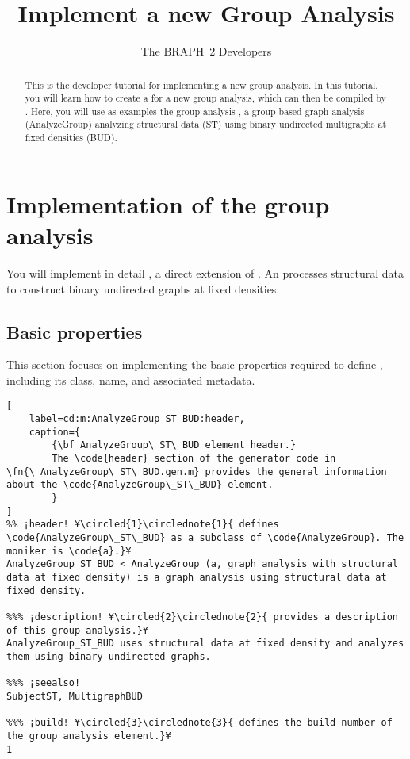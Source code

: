 \documentclass{tufte-handout}
\title{Implement a new Group Analysis}
\author[The BRAPH~2 Developers]{The BRAPH~2 Developers}
\begin{document}
\maketitle

\begin{abstract}
\noindent
This is the developer tutorial for implementing a new group analysis. 
In this tutorial, you will learn how to create a  for a new group analysis, which can then be compiled by .
Here, you will use as examples the group analysis , a group-based graph analysis (AnalyzeGroup) analyzing structural data (ST) using binary undirected multigraphs at fixed densities (BUD).
\end{abstract}

\tableofcontents

\clearpage

\section{Implementation of the group analysis}

You will implement in detail , a direct extension of .
An  processes structural data to construct binary undirected graphs at fixed densities.

\subsection{Basic properties}
This section focuses on implementing the basic properties required to define , including its class, name, and associated metadata.

\begin{lstlisting}[
	label=cd:m:AnalyzeGroup_ST_BUD:header,
	caption={
		{\bf AnalyzeGroup\_ST\_BUD element header.}
		The \code{header} section of the generator code in \fn{\_AnalyzeGroup\_ST\_BUD.gen.m} provides the general information about the \code{AnalyzeGroup\_ST\_BUD} element.
		}
]
%% ¡header! ¥\circled{1}\circlednote{1}{ defines \code{AnalyzeGroup\_ST\_BUD} as a subclass of \code{AnalyzeGroup}. The moniker is \code{a}.}¥
AnalyzeGroup_ST_BUD < AnalyzeGroup (a, graph analysis with structural data at fixed density) is a graph analysis using structural data at fixed density.

%%% ¡description! ¥\circled{2}\circlednote{2}{ provides a description of this group analysis.}¥
AnalyzeGroup_ST_BUD uses structural data at fixed density and analyzes them using binary undirected graphs.

%%% ¡seealso!
SubjectST, MultigraphBUD

%%% ¡build! ¥\circled{3}\circlednote{3}{ defines the build number of the group analysis element.}¥
1
\end{lstlisting}
\end{document}
